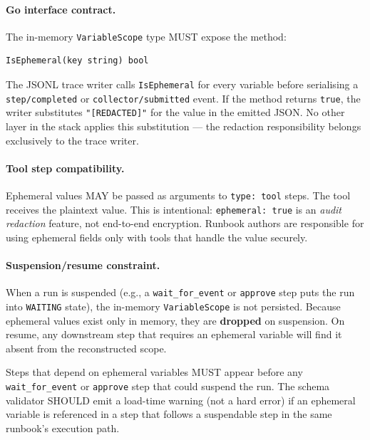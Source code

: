 \paragraph{Go interface contract.}
The in-memory \texttt{VariableScope} type MUST expose the method:

\begin{verbatim}
IsEphemeral(key string) bool
\end{verbatim}

The JSONL trace writer calls \texttt{IsEphemeral} for every variable before serialising
a \texttt{step/completed} or \texttt{collector/submitted} event.  If the method returns
\texttt{true}, the writer substitutes \texttt{"[REDACTED]"} for the value in the emitted
JSON.  No other layer in the stack applies this substitution — the redaction responsibility
belongs exclusively to the trace writer.

\paragraph{Tool step compatibility.}
Ephemeral values MAY be passed as arguments to \texttt{type: tool} steps.  The tool
receives the plaintext value.  This is intentional: \texttt{ephemeral: true} is an
\emph{audit redaction} feature, not end-to-end encryption.  Runbook authors are
responsible for using ephemeral fields only with tools that handle the value securely.

\paragraph{Suspension/resume constraint.}
When a run is suspended (e.g., a \texttt{wait\_for\_event} or \texttt{approve} step
puts the run into \texttt{WAITING} state), the in-memory \texttt{VariableScope} is not
persisted.  Because ephemeral values exist only in memory, they are \textbf{dropped} on
suspension.  On resume, any downstream step that requires an ephemeral variable will
find it absent from the reconstructed scope.

\begin{tcolorbox}[colback=yellow!10,colframe=orange!60,title=Constraint: ephemeral variables and suspension]
Steps that depend on ephemeral variables MUST appear before any \texttt{wait\_for\_event}
or \texttt{approve} step that could suspend the run.  The schema validator SHOULD emit a
load-time warning (not a hard error) if an ephemeral variable is referenced in a
step that follows a suspendable step in the same runbook's execution path.
\end{tcolorbox}

